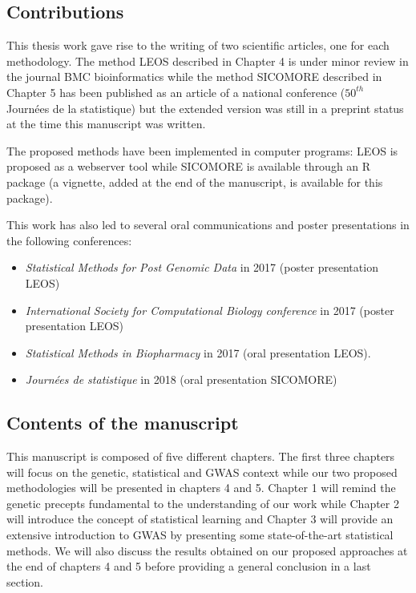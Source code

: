 \documentclass[]{book}
\begin{document}
\hypertarget{contributions}{%
\subsection*{Contributions}\label{contributions}}

This thesis work gave rise to the writing of two scientific articles,
one for each methodology. The method LEOS described in Chapter 4 is
under minor review in the journal BMC bioinformatics while the method
SICOMORE described in Chapter 5 has been published as an article of a
national conference (\(50^{th}\) Journées de la statistique) but the
extended version was still in a preprint status at the time this
manuscript was written.

The proposed methods have been implemented in computer programs: LEOS is
proposed as a webserver tool while SICOMORE is available through an R
package (a vignette, added at the end of the manuscript, is available
for this package).

This work has also led to several oral communications and poster
presentations in the following conferences:

\begin{itemize}
\item
  \emph{Statistical Methods for Post Genomic Data} in 2017 (poster
  presentation LEOS)
\item
  \emph{International Society for Computational Biology conference} in 2017
  (poster presentation LEOS)
\item
  \emph{Statistical Methods in Biopharmacy} in 2017 (oral presentation
  LEOS).
\item
  \emph{Journées de statistique} in 2018 (oral presentation SICOMORE)
\end{itemize}

\hypertarget{contents-of-the-manuscript}{%
\subsection*{Contents of the manuscript}\label{contents-of-the-manuscript}}

This manuscript is composed of five different chapters. The first three
chapters will focus on the genetic, statistical and GWAS context while
our two proposed methodologies will be presented in chapters 4 and 5.
Chapter 1 will remind the genetic precepts fundamental to the
understanding of our work while Chapter 2 will introduce the concept of
statistical learning and Chapter 3 will provide an extensive
introduction to GWAS by presenting some state-of-the-art statistical
methods. We will also discuss the results obtained on our proposed
approaches at the end of chapters 4 and 5 before providing a general
conclusion in a last section.
\end{document}
